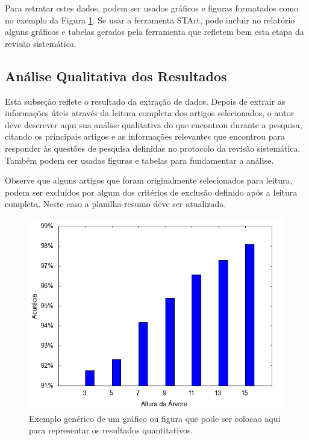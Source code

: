 \documentclass[12pt]{article}
\begin{document}
Para retratar estes dados, podem ser usados gráficos e figuras formatados como no exemplo da Figura \ref{fig:depth}. Se usar a ferramenta STArt, pode incluir no relatório alguns gráficos e tabelas gerados pela ferramenta que refletem bem esta etapa da revisão sistemática.

\subsection{Análise Qualitativa dos Resultados}

Esta subseção reflete o resultado da extração de dados. Depois de extrair as informações úteis através da leitura completa dos artigos selecionados, o autor deve descrever aqui sua análise qualitativa do que encontrou durante a pesquisa, citando os principais artigos e as informações relevantes que encontrou para responder às questões de pesquisa definidas no protocolo da revisão sistemática. Também podem ser usadas figuras e tabelas para fundamentar a análise.

Observe que alguns artigos que foram originalmente selecionados para leitura, podem ser excluídos por algum dos critérios de exclusão definido após a leitura completa. Neste caso a planilha-resumo deve ser atualizada.

\begin{figure}[tb]
    \centering
    \includegraphics[scale=0.7]{tree-depth.png}
    \caption{Exemplo genérico de um gráfico ou figura que pode ser colocao aqui para representar os resultados quantitativos.}
    \label{fig:depth}
\end{figure}
\end{document}
